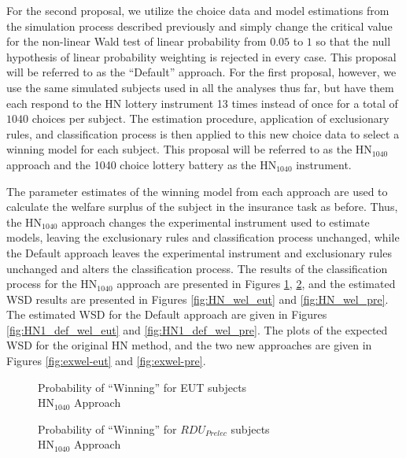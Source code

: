 \documentclass[../main.tex]{subfiles}
\begin{document}
For the second proposal, we utilize the choice data and model estimations from the simulation process described previously and simply change the critical value for the non-linear Wald test of linear probability from $0.05$ to $1$ so that the null hypothesis of linear probability weighting is rejected in every case.
This proposal will be referred to as the \enquote{Default} approach.
For the first proposal, however, we use the same simulated subjects used in all the analyses thus far, but have them each respond to the HN lottery instrument 13 times instead of once for a total of $1040$ choices per subject.
The estimation procedure, application of exclusionary rules, and classification process is then applied to this new choice data to select a winning model for each subject.
This proposal will be referred to as the $\text{HN}_{1040}$ approach and the 1040 choice lottery battery as the $\text{HN}_{1040}$ instrument.

The parameter estimates of the winning model from each approach are used to calculate the welfare surplus of the subject in the insurance task as before.
Thus, the $\text{HN}_{1040}$ approach changes the experimental instrument used to estimate models, leaving the exclusionary rules and classification process unchanged, while the Default approach leaves the experimental instrument and exclusionary rules unchanged and alters the classification process.
The results of the classification process for the $\text{HN}_{1040}$ approach are presented in Figures \ref{fig:HN_win_eut}, \ref{fig:HN_win_pre}, and the estimated WSD results are presented in Figures \ref{fig:HN_wel_eut} and \ref{fig:HN_wel_pre}.
The estimated WSD for the Default approach are given in Figures \ref{fig:HN1_def_wel_eut} and \ref{fig:HN1_def_wel_pre}.
The plots of the expected WSD for the original HN method, and the two new approaches are given in Figures \ref{fig:exwel-eut} and \ref{fig:exwel-pre}.

\begin{figure}[h!]
	\center
	\caption{Probability of \enquote{Winning} for EUT subjects\\$\text{HN}_{1040}$ Approach}
	\label{fig:HN_win_eut}
\end{figure}

\begin{figure}[h!]
	\center
	\caption{Probability of \enquote{Winning} for $\mathit{RDU_{Prelec}}$ subjects\\$\text{HN}_{1040}$ Approach}
	\label{fig:HN_win_pre}
\end{figure}
\end{document}
